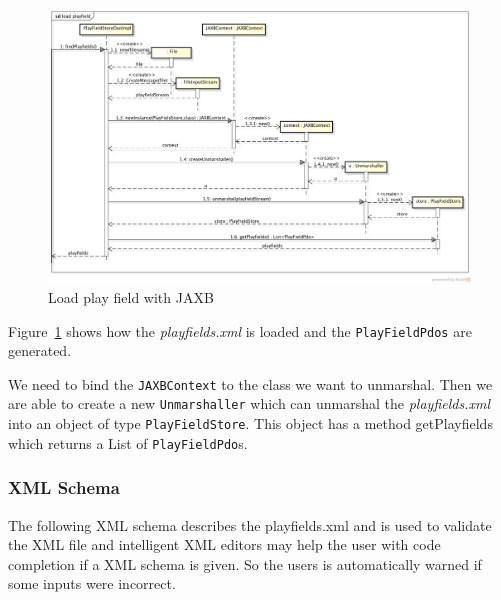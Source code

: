 \documentclass[fontsize=12pt,
               paper=a4,
               twoside=false,
               parskip=half,
               ]{scrartcl}
\begin{document}
\begin{figure}[H]
	\centering
	\includegraphics[width=15.5cm]{./img/jaxb-load-playfield-sd.png}
	\caption[Load play field]{Load play field with JAXB}
	\label{fig:load_playfield}
\end{figure}

Figure~\ref{fig:load_playfield} shows how the \emph{playfields.xml} is loaded and the \texttt{PlayFieldPdos} are generated.

We need to bind the \texttt{JAXBContext} to the class we want to unmarshal. Then we are able to create a new \texttt{Unmarshaller} which can unmarshal the \emph{playfields.xml} into an object of type \texttt{PlayFieldStore}. This object has a method getPlayfields which returns a List of \texttt{PlayFieldPdo}s.


\subsubsection{XML Schema}

The following XML schema describes the playfields.xml and is used to validate the XML file and intelligent XML editors may help the user with code completion if a XML schema is given. So the users is automatically warned if some inputs were incorrect.
\end{document}
